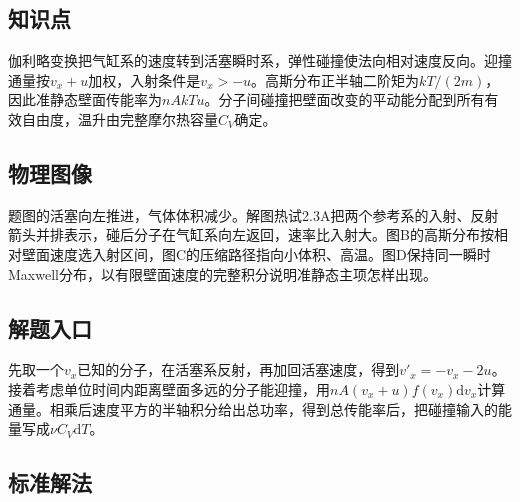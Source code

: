 \documentclass[UTF8,fontset=fandol,a4paper,11pt]{ctexart}
\begin{document}
\subsection*{知识点}

伽利略变换把气缸系的速度转到活塞瞬时系，弹性碰撞使法向相对速度反向。迎撞通量按$v_x+u$加权，入射条件是$v_x>-u$。高斯分布正半轴二阶矩为$kT/(2m)$，因此准静态壁面传能率为$nAkTu$。分子间碰撞把壁面改变的平动能分配到所有有效自由度，温升由完整摩尔热容量$C_V$确定。



\subsection*{物理图像}

题图的活塞向左推进，气体体积减少。解图热试2.3A把两个参考系的入射、反射箭头并排表示，碰后分子在气缸系向左返回，速率比入射大。图B的高斯分布按相对壁面速度选入射区间，图C的压缩路径指向小体积、高温。图D保持同一瞬时Maxwell分布，以有限壁面速度的完整积分说明准静态主项怎样出现。



\subsection*{解题入口}

先取一个$v_x$已知的分子，在活塞系反射，再加回活塞速度，得到$v'_x=-v_x-2u$。接着考虑单位时间内距离壁面多远的分子能迎撞，用$nA(v_x+u)f(v_x)\mathrm dv_x$计算通量。相乘后速度平方的半轴积分给出总功率，得到总传能率后，把碰撞输入的能量写成$\nu C_V\mathrm dT$。



\subsection*{标准解法}
\end{document}
